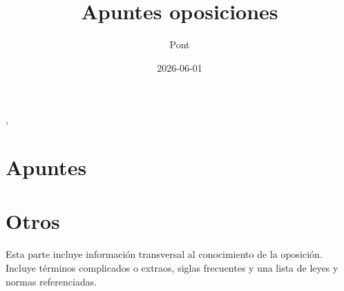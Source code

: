 \documentclass[12pt, oneside]{book}
\title{Apuntes oposiciones} %
\author{Pont}%
\date{2026-06-01}
\begin{document}

    \maketitle
    \tableofcontents
    \setcounter{tocdepth}{3},
    \newpage
    \part{Apuntes}
    
    
    

    \newpage
    \part{Otros}
    \setcounter{section}{0}
    Esta parte incluye información transversal al conocimiento de la oposición. Incluye términos complicados o extraos, siglas frecuentes y una lista de leyes y normas referenciadas.
    
    \newpage
    
    \newpage
    
\end{document}
